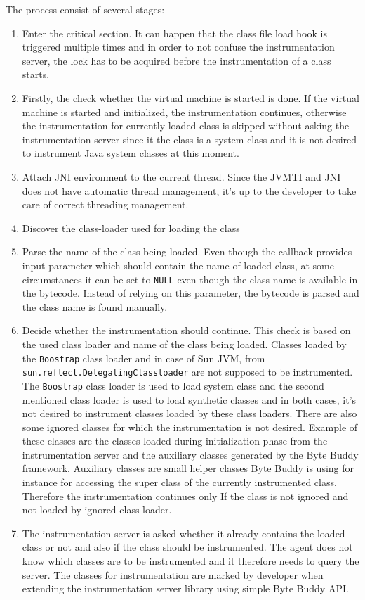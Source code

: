 The process consist of several stages:
\begin{enumerate}
	
	\item Enter the critical section. It can happen that the class file load hook is triggered multiple times and in order to not confuse the instrumentation server, the lock has to be acquired before the instrumentation of a class starts.
	\item Firstly, the check whether the virtual machine is started is done. If the virtual machine is started and initialized, the instrumentation continues, otherwise the instrumentation for currently loaded class is skipped without asking the instrumentation server since it the class is a system class and it is not desired to instrument Java system classes at this moment.
	\item Attach JNI environment to the current thread. Since the JVMTI and JNI does not have automatic thread management, it's up to the developer to take care of correct threading management.
	\item Discover the class-loader used for loading the class
	\item Parse the name of the class being loaded. Even though the callback provides input parameter which should contain the name of loaded class, at some circumstances it can be set to \texttt{NULL} even though the class name is available in the bytecode. Instead of relying on this parameter, the bytecode is parsed and the class name is found manually.
	\item Decide whether the instrumentation should continue. This check is based on the used class loader and name of the class being loaded. Classes loaded by the \texttt{Boostrap} class loader and in case of Sun JVM, from \texttt{sun.reflect.DelegatingClassloader} are not supposed to be instrumented. 
	The \texttt{Boostrap} class loader is used to load system class and the second mentioned class loader is used to load synthetic classes and in both cases, it's not desired to instrument classes loaded by these class loaders.
	There are also some ignored classes for which the instrumentation is not desired. Example of these classes are the classes loaded during initialization phase from the instrumentation server and the auxiliary classes generated by the Byte Buddy framework. Auxiliary classes are small helper classes Byte Buddy is using for instance for accessing the super class of the currently instrumented class. Therefore the instrumentation continues only If the class is not ignored and not loaded by ignored class loader.
	\item The instrumentation server is asked whether it already contains the loaded class or not and also if the class should be instrumented. The agent does not know which classes are to be instrumented and it therefore needs to query the server. The classes for instrumentation are marked by developer when extending the instrumentation server library using simple Byte Buddy API. 
	

\end{enumerate}
